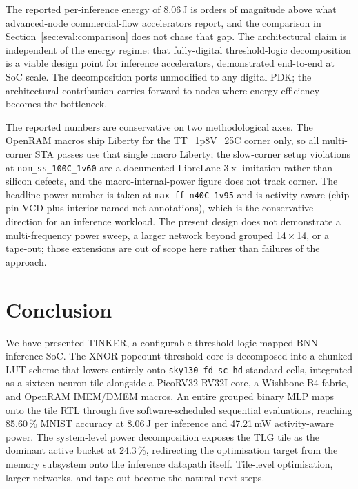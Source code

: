 \documentclass[conference]{IEEEtran}
\begin{document}
The reported per-inference energy of 8.06\,\textmu J is orders of
magnitude above what advanced-node commercial-flow accelerators
report, and the comparison in Section~\ref{sec:eval:comparison}
does not chase that gap. The architectural claim is independent
of the energy regime: that fully-digital threshold-logic
decomposition is a viable design point for inference accelerators,
demonstrated end-to-end at SoC scale. The decomposition ports
unmodified to any digital PDK; the architectural contribution
carries forward to nodes where energy efficiency becomes the
bottleneck.

The reported numbers are conservative on two methodological axes.
The OpenRAM macros ship Liberty for the TT\_1p8V\_25C corner only, so
all multi-corner STA passes use that single macro Liberty; the
slow-corner setup violations at \texttt{nom\_ss\_100C\_1v60} are a
documented LibreLane 3.x limitation rather than silicon defects, and
the macro-internal-power figure does not track corner. The headline
power number is taken at \texttt{max\_ff\_n40C\_1v95} and is
activity-aware (chip-pin VCD plus interior named-net annotations),
which is the conservative direction for an inference workload. The
present design does not demonstrate a multi-frequency power sweep, a
larger network beyond grouped 14\,\(\times\)\,14, or a tape-out;
those extensions are out of scope here rather than failures of the
approach.

\section{Conclusion}
\label{sec:conclusion}

We have presented TINKER, a configurable threshold-logic-mapped
BNN inference SoC. The XNOR-popcount-threshold core is decomposed
into a chunked LUT scheme that lowers entirely onto
\texttt{sky130\_fd\_sc\_hd} standard cells, integrated as a
sixteen-neuron tile alongside a PicoRV32 RV32I core, a Wishbone B4
fabric, and OpenRAM IMEM/DMEM macros. An entire grouped binary MLP
maps onto the tile RTL through five software-scheduled sequential
evaluations, reaching 85.60\,\% MNIST accuracy at 8.06\,\textmu J
per inference and 47.21\,mW activity-aware power. The system-level
power decomposition exposes the TLG tile as the dominant active
bucket at 24.3\,\%, redirecting the optimisation target from the
memory subsystem onto the inference datapath itself. Tile-level
optimisation, larger networks, and tape-out become the natural
next steps.
\end{document}
